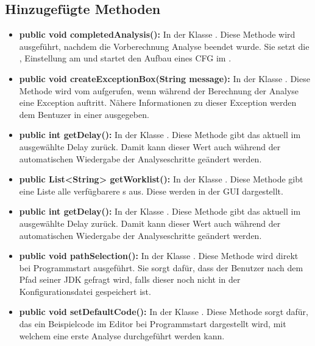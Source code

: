 \subsection{Hinzugefügte Methoden}

\begin{itemize}
	\item \textbf{public void completedAnalysis():} In der Klasse . Diese Methode wird ausgeführt, nachdem die Vorberechnung Analyse beendet wurde. Sie setzt die , Einstellung am  und startet den Aufbau eines CFG im .
	
	\item \textbf{public void createExceptionBox(String message):} In der Klasse . Diese Methode wird vom  aufgerufen, wenn während der Berechnung der Analyse eine Exception auftritt. Nähere Informationen zu dieser Exception werden dem Bentuzer in einer  ausgegeben.
	
	\item \textbf{public int getDelay():} In der Klasse . Diese Methode gibt das aktuell im  ausgewählte Delay zurück. Damit kann dieser Wert auch während der automatischen Wiedergabe der Analyseschritte geändert werden.
	
	\item \textbf{public List<String> getWorklist():} In der Klasse . Diese Methode gibt eine Liste alle verfügbarere s aus. Diese werden in der GUI dargestellt.
	
	\item \textbf{public int getDelay():} In der Klasse . Diese Methode gibt das aktuell im  ausgewählte Delay zurück. Damit kann dieser Wert auch während der automatischen Wiedergabe der Analyseschritte geändert werden.
	
	\item \textbf{public void pathSelection():} In der Klasse . Diese Methode wird direkt bei Programmstart ausgeführt. Sie sorgt dafür, dass der Benutzer nach dem Pfad seiner JDK gefragt wird, falls dieser noch nicht in der Konfigurationsdatei gespeichert ist. 
	
	\item \textbf{public void setDefaultCode():} In der Klasse . Diese Methode sorgt dafür, das ein Beispielcode im Editor bei Programmstart dargestellt wird, mit welchem eine erste Analyse durchgeführt werden kann.
	

\end{itemize}
